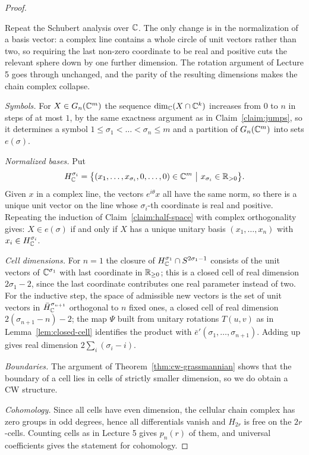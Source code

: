 \begin{proof}
\begin{strategy}
Repeat the Schubert analysis over $\mathbb{C}$. The only change is in the normalization
of a basis vector: a complex line contains a whole circle of unit vectors rather
than two, so requiring the last non-zero coordinate to be real and positive cuts
the relevant sphere down by one further dimension. The rotation argument of
Lecture 5 goes through unchanged, and the parity of the resulting dimensions
makes the chain complex collapse.
\end{strategy}

 \emph{Symbols.} For $X\in G_n(\mathbb{C}^m)$ the sequence
$\dim_{\mathbb{C}}(X\cap\mathbb{C}^k)$ increases from $0$ to $n$ in steps of at most $1$, by the
same exactness argument as in Claim~\ref{claim:jumps}, so it determines a symbol
$1\le\sigma_1<\dots<\sigma_n\le m$ and a partition of $G_n(\mathbb{C}^m)$ into sets
$e(\sigma)$.

 \emph{Normalized bases.} Put
\[
H^{\sigma_i}_{\mathbb{C}}=\big\{(x_1,\dots,x_{\sigma_i},0,\dots,0)\in\mathbb{C}^m
\ \big|\ x_{\sigma_i}\in\mathbb{R}_{>0}\big\}.
\]
Given $x$ in a complex line, the vectors $e^{i\theta}x$ all have the same norm,
so there is a unique unit vector on the line whose $\sigma_i$-th coordinate is
real and positive. Repeating the induction of Claim~\ref{claim:half-space} with
complex orthogonality gives: $X\in e(\sigma)$ if and only if $X$ has a unique
unitary basis $(x_1,\dots,x_n)$ with $x_i\in H^{\sigma_i}_{\mathbb{C}}$.

 \emph{Cell dimensions.} For $n=1$ the closure of
$H^{\sigma_1}_{\mathbb{C}}\cap S^{2\sigma_1-1}$ consists of the unit vectors of
$\mathbb{C}^{\sigma_1}$ with last coordinate in $\mathbb{R}_{\ge0}$; this is a closed cell of
real dimension $2\sigma_1-2$, since the last coordinate contributes one real
parameter instead of two. For the inductive step, the space of admissible new
vectors is the set of unit vectors in $\bar H^{\sigma_{n+1}}_{\mathbb{C}}$ orthogonal to
$n$ fixed ones, a closed cell of real dimension
$2(\sigma_{n+1}-n)-2$; the map $\Psi$ built from unitary rotations
$T(u,v)$ as in Lemma~\ref{lem:closed-cell} identifies the product with
$\bar e'(\sigma_1,\dots,\sigma_{n+1})$. Adding up gives real dimension
$2\sum_i(\sigma_i-i)$.

 \emph{Boundaries.} The argument of
Theorem~\ref{thm:cw-grassmannian} shows that the boundary of a cell lies in
cells of strictly smaller dimension, so we do obtain a CW structure.

 \emph{Cohomology.} Since all cells have even dimension, the cellular
chain complex has zero groups in odd degrees, hence all differentials vanish and
$H_{2r}$ is free on the $2r$-cells. Counting cells as in Lecture 5 gives
$p_n(r)$ of them, and universal coefficients gives the statement for
cohomology.
\end{proof}

